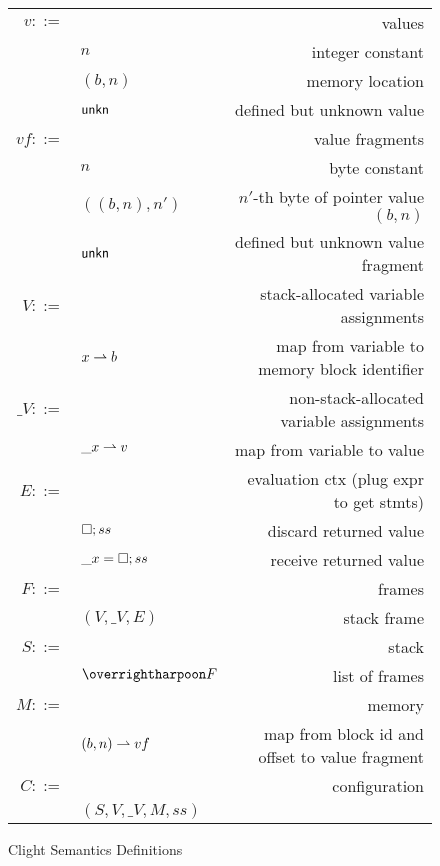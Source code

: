 \begin{figure}[h]
\begin{small}
\begin{center}
  \begin{tabularx}{\columnwidth}{rlR}
    $v ::= $ & & values \\
    & $n$    & integer constant \\
    & $(b, n)$                        & memory location \\
    & $\text{\textsf{unkn}}{}$                        & defined but unknown value \\
    [1.2mm]

    ${vf} ::= $ & & value fragments \\
    & $n$    & byte constant \\
    & $((b,n), n')$ & $n'$-th byte of pointer value $(b,n)$ \\
    & $\text{\textsf{unkn}}{}$                        & defined but unknown value fragment \\
    [1.2mm]
    
    $V ::=$ & & stack-allocated variable assignments \\
    & $x\rightharpoonup b$ & map from variable to memory block identifier \\
    [1.2mm]

    $\_V ::=$ & & non-stack-allocated variable assignments \\
    & $\_x\rightharpoonup v$ & map from variable to value \\
    [1.2mm]

    $E ::=$ & & evaluation ctx (plug expr to get stmts) \\
    & $\Box; ss$ & discard returned value \\
    & $\_x=\Box; ss$ & receive returned value \\
    [1.2mm]

    $F ::=$ & & frames \\
    & $(V, \_V, E)$ & stack frame \\
    [1.2mm]
    
    $S ::=$ & & stack \\
    & $\ls{F}$ & list of frames \\
    [1.2mm]

    $M ::=$ & & memory \\
    & $(b, n) \rightharpoonup vf$ & map from block id and offset to value fragment \\
    [1.2mm]

    $C ::=$ & & configuration \\
    & $(S, V, \_V, M, ss)$ &  \\
    [1.2mm]
  \end{tabularx}
\end{center}
\end{small}
\caption{Clight Semantics Definitions}
\label{fig:clight-semantics-defs}
\end{figure}

